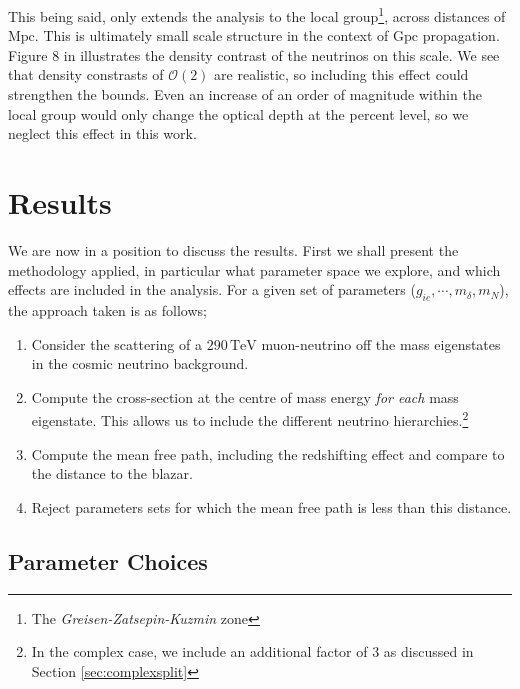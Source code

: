 \documentclass[11pt]{article}
\numberwithin{equation}{section}
\numberwithin{figure}{section}
\numberwithin{table}{section}
\newcommand{\mO}{\mathcal{O}}
\begin{document}
This being said, \cite{Ringwald2004} only extends the analysis to the local group\footnote{The \textit{Greisen-Zatsepin-Kuzmin} zone}, across distances of $\textrm{Mpc}$. This is ultimately small scale structure in the context of $\textrm{Gpc}$ propagation. Figure 8 in \cite{Ringwald2004} illustrates the density contrast of the neutrinos on this scale. We see that density constrasts of $\mO(2)$ are realistic, so including this effect could strengthen the bounds. Even an increase of an order of magnitude within the local group would only change the optical depth at the percent level, so we neglect this effect in this work.



\section{Results}\label{sec:results}



We are now in a position to discuss the results. First we shall present the methodology applied, in particular what parameter space we explore, and which effects are included in the analysis. For a given set of parameters ($g_{ie}, \cdots, m_\delta, m_N$), the approach taken is as follows;
\begin{enumerate}
  \item Consider the scattering of a $290 \, \textrm{TeV}$ muon-neutrino off the mass eigenstates in the cosmic neutrino background.
  \item Compute the cross-section at the centre of mass energy \emph{for each} mass eigenstate. This allows us to include the different neutrino hierarchies.\footnote{In the complex case, we include an additional factor of $3$ as discussed in Section \ref{sec:complexsplit}}
  \item Compute the mean free path, including the redshifting effect and compare to the distance to the blazar.
  \item Reject parameters sets for which the mean free path is less than this distance.
\end{enumerate}

\subsection{Parameter Choices}
\end{document}
